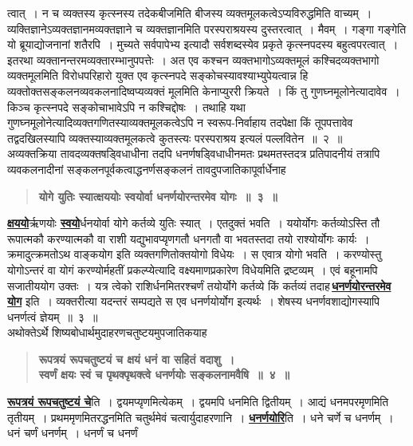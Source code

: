 \documentclass[11pt, openany]{book}
\begin{document}
\newpage

\begin{sloppypar}
\noindent त्वात्~। न च व्यक्तस्य कृत्स्नस्य तदेकबीजमिति बीजस्य व्यक्तमूलकत्वेऽप्यविरुद्धमिति वाच्यम्~। व्यक्तिज्ञानेऽव्यक्तज्ञानमव्यक्तज्ञाने च व्यक्तज्ञानमिति परस्पराश्रयस्य दुस्तरत्वात्~। मैवम्~। {\color{violet}गङ्गा गङ्गेति यो ब्रूयाद्योजनानां शतैरपि~। मुच्यते सर्वपापेभ्य} इत्यादौ सर्वशब्दस्येव प्रकृते कृत्स्नपदस्य बहुत्वपरत्वात्~। इतरथा व्यक्तानन्तरमव्यक्तारम्भानुपपत्तेः~। अत एव कश्चन व्यक्तभागोऽव्यक्तमूलं कश्चिदव्यक्तभागो व्यक्तमूलमिति विरोधपरिहारो युक्त एव कृत्स्नपदे सङ्कोचस्यावश्याभ्युपेयत्वान्न हि व्यक्तोक्तसङ्कलनव्यवकलनादिष्वप्यव्यक्तं मूलमिति केनाप्युररी क्रियते~। किं तु गुणघ्नमूलोनेत्यादावेव~। किञ्च कृत्स्नपदे सङ्कोचाभावेऽपि न कश्चिद्दोषः~। तथाहि यथा गुणघ्नमूलोनेत्यादिव्यक्तगणितस्याव्यक्तमूलकत्वेऽपि न स्वरूप-निर्वाहाय तदपेक्षा किं तूपपत्तावेव तद्वदखिलस्यापि व्यक्तस्याव्यक्तमूलकत्वे कुतस्त्यः परस्पराश्रय इत्यलं पल्लवितेन~॥~२~॥ \\

{\small अव्यक्तक्रिया तावदव्यक्तषड्विधाधीना तदपि धनर्णषड्विधाधीनमतः प्रथमतस्तदत्र प्रतिपादनीयं तत्रापि व्यवकलनादीनां सङ्कलनपूर्वकत्वाद्धनर्णसङ्कलनं तावदुपजातिकापूर्वार्धेनाह\textendash }

 \label{1.3}
\begin{quote}
{\large \textbf{{\color{purple}योगे युतिः स्यात्क्षययोः स्वयोर्वा धनर्णयोरन्तरमेव योगः~॥~३~॥}}}
\end{quote}

\hyperref[1.3]{\textbf{क्षययो}}र्ऋणयोः \hyperref[1.3]{\textbf{स्वयो}}र्धनयोर्वा योगे कर्तव्ये युतिः स्यात्~। एतदुक्तं भवति~। ययोर्योगः कर्तव्योऽस्ति तौ रूपात्मकौ करण्यात्मकौ वा राशी यद्युभावप्यृणगतौ धनगतौ वा भवतस्तदा तयो राश्योर्योगः कार्यः~। क्रमादुत्क्रमतोऽथ वाङ्कयोग इति व्यक्तगणितोक्तयोगो विधेयः~। स एवात्र योगो भवति~। करण्योस्तु योगोऽन्तरं वा योगं करण्योर्महतीं प्रकल्प्येत्यादि वक्ष्यमाणप्रकारेण विधेयमिति द्रष्टव्यम्~। एवं बहूनामपि सजातीययोग उक्तः~। यत्र त्वेको राशिर्धनमितरश्चर्णं तयोर्योगे कर्तव्ये किं कर्तव्यं तदाह\textendash \,\hyperref[1.3]{\textbf{धनर्णयोरन्तरमेव योग}} इति~। व्यक्तरीत्या यदन्तरं सम्पद्यते स एव धनर्णयोर्योग इत्यर्थः~। शेषस्य धनर्णवशाद्योगस्यापि धनर्णत्वं ज्ञेयम्~॥~३~॥\\

{\small अथोक्तेऽर्थे शिष्यबोधार्थमुदाहरणचतुष्टयमुपजातिकयाह\textendash }

 \label{1.4}
\begin{quote}
{\large \textbf{{\color{purple}रूपत्रयं रूपचतुष्टयं च क्षयं धनं वा सहितं वदाशु~।\\
स्वर्णं क्षयः स्वं च पृथक्पृथक्त्वे धनर्णयोः सङ्कलनामवैषि~॥~४~॥}}}
\end{quote}

\hyperref[1.4]{\textbf{रूपत्रयं रूपचतुष्टयं चे}}ति~। द्वयमप्यृणमित्येकम्~। द्वयमपि धनमिति द्वितीयम्~। आद्यं धनमपरमृणमिति तृतीयम्~। प्रथममृणमितरद्धनमिति चतुर्थमेवं चत्वार्युदाहरणानि~। \hyperref[1.4]{\textbf{धनर्णयोरि}}ति~। धने चर्णे च धनर्णम्~। धनं चर्णं धनर्णम्~। धनर्णं च धनर्णं
\end{sloppypar}
\end{document}
